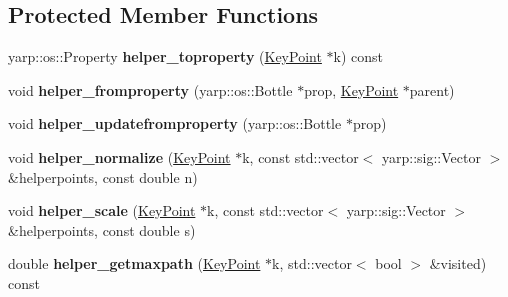 \subsection*{Protected Member Functions}
\begin{DoxyCompactItemize}
\item 
\mbox{\label{classassistive__rehab_1_1Skeleton_ae448d21825bfd36eccb328d16fef995a}} 
yarp\+::os\+::\+Property {\bfseries helper\+\_\+toproperty} (\hyperlink{classassistive__rehab_1_1KeyPoint}{Key\+Point} $\ast$k) const
\item 
\mbox{\label{classassistive__rehab_1_1Skeleton_a8e8fcac9b911ce9eaa0a97b81bffb357}} 
void {\bfseries helper\+\_\+fromproperty} (yarp\+::os\+::\+Bottle $\ast$prop, \hyperlink{classassistive__rehab_1_1KeyPoint}{Key\+Point} $\ast$parent)
\item 
\mbox{\label{classassistive__rehab_1_1Skeleton_a8b1fa988e848ef1fc06439be8eaa19a4}} 
void {\bfseries helper\+\_\+updatefromproperty} (yarp\+::os\+::\+Bottle $\ast$prop)
\item 
\mbox{\label{classassistive__rehab_1_1Skeleton_a574ad07752a2a59ea765e10282998bb4}} 
void {\bfseries helper\+\_\+normalize} (\hyperlink{classassistive__rehab_1_1KeyPoint}{Key\+Point} $\ast$k, const std\+::vector$<$ yarp\+::sig\+::\+Vector $>$ \&helperpoints, const double n)
\item 
\mbox{\label{classassistive__rehab_1_1Skeleton_aefdf8624092fcc2b5458b0be108da01a}} 
void {\bfseries helper\+\_\+scale} (\hyperlink{classassistive__rehab_1_1KeyPoint}{Key\+Point} $\ast$k, const std\+::vector$<$ yarp\+::sig\+::\+Vector $>$ \&helperpoints, const double s)
\item 
\mbox{\label{classassistive__rehab_1_1Skeleton_a66ea19f4fbec2b654e394686180abf43}} 
double {\bfseries helper\+\_\+getmaxpath} (\hyperlink{classassistive__rehab_1_1KeyPoint}{Key\+Point} $\ast$k, std\+::vector$<$ bool $>$ \&visited) const
\end{DoxyCompactItemize}
